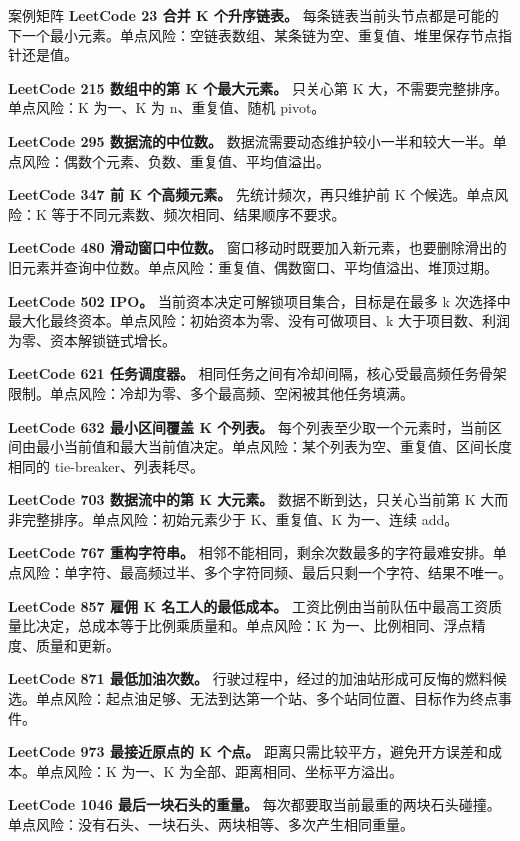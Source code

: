 \begin{principlebox}{案例矩阵}
\textbf{LeetCode 23 合并 K 个升序链表。}
每条链表当前头节点都是可能的下一个最小元素。单点风险：空链表数组、某条链为空、重复值、堆里保存节点指针还是值。

\textbf{LeetCode 215 数组中的第 K 个最大元素。}
只关心第 K 大，不需要完整排序。单点风险：K 为一、K 为 n、重复值、随机 pivot。

\textbf{LeetCode 295 数据流的中位数。}
数据流需要动态维护较小一半和较大一半。单点风险：偶数个元素、负数、重复值、平均值溢出。

\textbf{LeetCode 347 前 K 个高频元素。}
先统计频次，再只维护前 K 个候选。单点风险：K 等于不同元素数、频次相同、结果顺序不要求。

\textbf{LeetCode 480 滑动窗口中位数。}
窗口移动时既要加入新元素，也要删除滑出的旧元素并查询中位数。单点风险：重复值、偶数窗口、平均值溢出、堆顶过期。

\textbf{LeetCode 502 IPO。}
当前资本决定可解锁项目集合，目标是在最多 k 次选择中最大化最终资本。单点风险：初始资本为零、没有可做项目、k 大于项目数、利润为零、资本解锁链式增长。

\textbf{LeetCode 621 任务调度器。}
相同任务之间有冷却间隔，核心受最高频任务骨架限制。单点风险：冷却为零、多个最高频、空闲被其他任务填满。

\textbf{LeetCode 632 最小区间覆盖 K 个列表。}
每个列表至少取一个元素时，当前区间由最小当前值和最大当前值决定。单点风险：某个列表为空、重复值、区间长度相同的 tie-breaker、列表耗尽。

\textbf{LeetCode 703 数据流中的第 K 大元素。}
数据不断到达，只关心当前第 K 大而非完整排序。单点风险：初始元素少于 K、重复值、K 为一、连续 add。

\textbf{LeetCode 767 重构字符串。}
相邻不能相同，剩余次数最多的字符最难安排。单点风险：单字符、最高频过半、多个字符同频、最后只剩一个字符、结果不唯一。

\textbf{LeetCode 857 雇佣 K 名工人的最低成本。}
工资比例由当前队伍中最高工资质量比决定，总成本等于比例乘质量和。单点风险：K 为一、比例相同、浮点精度、质量和更新。

\textbf{LeetCode 871 最低加油次数。}
行驶过程中，经过的加油站形成可反悔的燃料候选。单点风险：起点油足够、无法到达第一个站、多个站同位置、目标作为终点事件。

\textbf{LeetCode 973 最接近原点的 K 个点。}
距离只需比较平方，避免开方误差和成本。单点风险：K 为一、K 为全部、距离相同、坐标平方溢出。

\textbf{LeetCode 1046 最后一块石头的重量。}
每次都要取当前最重的两块石头碰撞。单点风险：没有石头、一块石头、两块相等、多次产生相同重量。


\end{principlebox}

